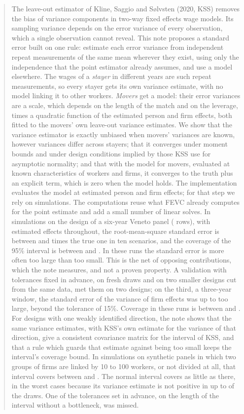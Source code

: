 \begin{abstract}
\noindent The leave-out estimator of Kline, Saggio and S{\o}lvsten (2020, KSS) removes the bias of variance
components in two-way fixed effects wage models. Its sampling variance depends on the error variance of every
observation, which a single observation cannot reveal. This note proposes a standard error built on one rule:
estimate each error variance from independent repeat measurements of the same mean wherever they exist, using
only the independence that the point estimator already assumes, and use a model elsewhere. The wages of a
\emph{stayer} in different years are such repeat measurements, so every stayer gets its own variance estimate,
with no model linking it to other workers. \emph{Movers} get a model: their error variances are a scale, which depends on the length of the match and
on the leverage, times a quadratic function of the estimated person and firm effects, both fitted to the
movers' own leave-out variance estimates. We show that the variance estimator is exactly unbiased when movers'
variances are known, however variances differ across stayers; that it converges under moment bounds and under
design conditions implied by those KSS use for asymptotic normality; and that with the model for movers,
evaluated at known characteristics of workers and firms, it converges to the truth plus an explicit term,
which is zero when the model holds. The implementation evaluates the model at estimated person and firm
effects; for that step we rely on simulations. The computations reuse what FEVC already computes for the point
estimate and add a small number of linear solves. In simulations on the design of a six-year Veneto panel
( rows), with estimated effects throughout, the root-mean-square standard error is between
 and  times the true one in ten scenarios, and the coverage of the 95\% interval
is between  and . In these runs the standard error is more often too large than too small.
This is the net of opposing contributions, which the note measures, and not a proven property. A
validation with tolerances fixed in advance, on fresh draws and on two smaller designs cut from the same
data, met them on two designs; on the third, a three-year window, the standard error of the variance of firm
effects was up to  too large, beyond the tolerance of 15\%. Coverage in these runs is
between  and . For
designs with one weakly identified direction, the note shows that the same variance estimates, with KSS's own
estimate for the variance of that direction, give a consistent covariance matrix for the interval of KSS, and
that a rule which guards that estimate against being too small keeps the interval's coverage bound. In
simulations on synthetic panels in which two groups of firms are linked by 10 to 100 workers, or not divided
at all, that interval covers between  and . The normal interval covers as little as
 there, in the worst cases because its variance estimate is not positive in up to
 of the draws. One of the tolerances set in advance, on the length of the interval without a
bottleneck, was missed.
\end{abstract}
